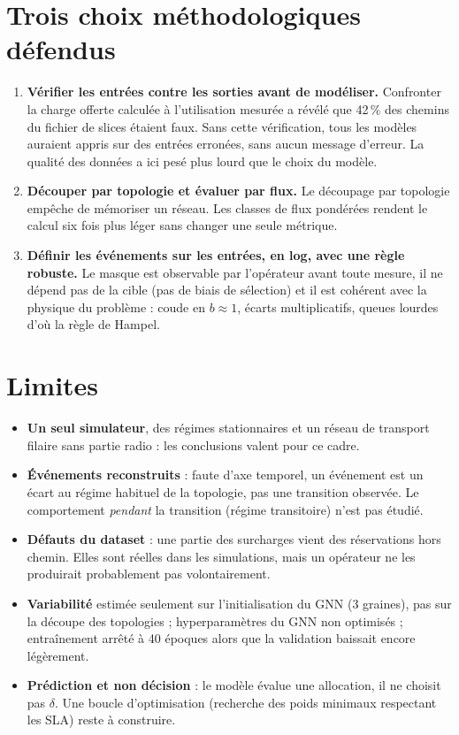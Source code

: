 \section{Trois choix méthodologiques défendus}
\begin{enumerate}
  \item \textbf{Vérifier les entrées contre les sorties avant de modéliser.} Confronter la charge offerte calculée à l'utilisation mesurée a révélé que 42\,\% des chemins du fichier de slices étaient faux. Sans cette vérification, tous les modèles auraient appris sur des entrées erronées, sans aucun message d'erreur. La qualité des données a ici pesé plus lourd que le choix du modèle.
  \item \textbf{Découper par topologie et évaluer par flux.} Le découpage par topologie empêche de mémoriser un réseau. Les classes de flux pondérées rendent le calcul six fois plus léger sans changer une seule métrique.
  \item \textbf{Définir les événements sur les entrées, en log, avec une règle robuste.} Le masque est observable par l'opérateur avant toute mesure, il ne dépend pas de la cible (pas de biais de sélection) et il est cohérent avec la physique du problème : coude en $b\approx1$, écarts multiplicatifs, queues lourdes d'où la règle de Hampel.
\end{enumerate}

\section{Limites}\label{sec:limites}
\begin{itemize}
  \item \textbf{Un seul simulateur}, des régimes stationnaires et un réseau de transport filaire sans partie radio : les conclusions valent pour ce cadre.
  \item \textbf{Événements reconstruits} : faute d'axe temporel, un événement est un écart au régime habituel de la topologie, pas une transition observée. Le comportement \emph{pendant} la transition (régime transitoire) n'est pas étudié.
  \item \textbf{Défauts du dataset} : une partie des surcharges vient des réservations hors chemin. Elles sont réelles dans les simulations, mais un opérateur ne les produirait probablement pas volontairement.
  \item \textbf{Variabilité} estimée seulement sur l'initialisation du GNN (3 graines), pas sur la découpe des topologies ; hyperparamètres du GNN non optimisés ; entraînement arrêté à 40 époques alors que la validation baissait encore légèrement.
  \item \textbf{Prédiction et non décision} : le modèle évalue une allocation, il ne choisit pas $\delta$. Une boucle d'optimisation (recherche des poids minimaux respectant les SLA) reste à construire.
\end{itemize}

